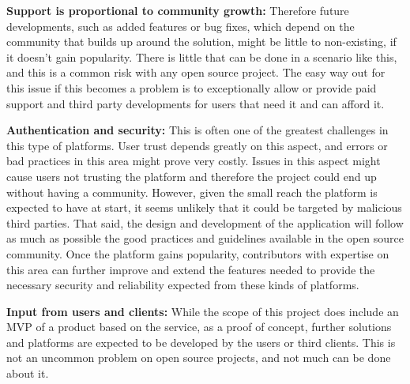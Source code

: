 \begin{addmargin}[1em]{0em}
\textbf{Support is proportional to community growth:}
Therefore future developments, such as added features or bug fixes, which depend on the community that builds up around the solution, might be little to non-existing, if it doesn’t gain popularity. There is little that can be done in a scenario like this, and this is a common risk with any open source project. The easy way out for this issue if this becomes a problem is to exceptionally allow or provide paid support and third party developments for users that need it and can afford it.

\textbf{Authentication and security:}
This is often one of the greatest challenges in this type of platforms. User trust depends greatly on this aspect, and errors or bad practices in this area might prove very costly. Issues in this aspect might cause users not trusting the platform and therefore the project could end up without having a community. However, given the small reach the platform is expected to have at start, it seems unlikely that it could be targeted by malicious third parties. That said, the design and development of the application will follow as much as possible the good practices and guidelines available in the open source community. Once the platform gains popularity, contributors with expertise on this area can further improve and extend the features needed to provide the necessary security and reliability expected from these kinds of platforms.

\textbf{Input from users and clients:}
While the scope of this project does include an MVP of a product based on the service, as a proof of concept, further solutions and platforms are expected to be developed by the users or third clients. This is not an uncommon problem on open source projects, and not much can be done about it.
\end{addmargin}